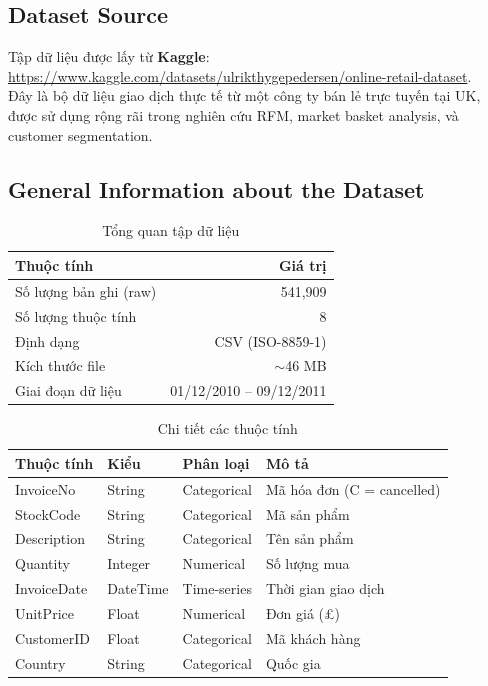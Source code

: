 \documentclass[a4paper,12pt]{article}
\begin{document}
\subsection{Dataset Source}
Tập dữ liệu được lấy từ \textbf{Kaggle}: \\

\url{https://www.kaggle.com/datasets/ulrikthygepedersen/online-retail-dataset}. \\

Đây là bộ dữ liệu giao dịch thực tế từ một công ty bán lẻ trực tuyến tại UK, được sử dụng rộng rãi trong nghiên cứu RFM, market basket analysis, và customer segmentation.

\subsection{General Information about the Dataset}

\begin{table}[H]
\centering
\caption{Tổng quan tập dữ liệu}
\begin{tabular}{|l|r|}
\hline
\textbf{Thuộc tính} & \textbf{Giá trị} \\
\hline
Số lượng bản ghi (raw) & 541,909 \\
Số lượng thuộc tính & 8 \\
Định dạng & CSV (ISO-8859-1) \\
Kích thước file & $\sim$46 MB \\
Giai đoạn dữ liệu & 01/12/2010 -- 09/12/2011 \\
\hline
\end{tabular}
\end{table}

\begin{table}[H]
\centering
\caption{Chi tiết các thuộc tính}
\begin{tabular}{|l|l|l|p{6cm}|}
\hline
\textbf{Thuộc tính} & \textbf{Kiểu} & \textbf{Phân loại} & \textbf{Mô tả} \\
\hline
InvoiceNo & String & Categorical & Mã hóa đơn (C = cancelled) \\
StockCode & String & Categorical & Mã sản phẩm \\
Description & String & Categorical & Tên sản phẩm \\
Quantity & Integer & Numerical & Số lượng mua \\
InvoiceDate & DateTime & Time-series & Thời gian giao dịch \\
UnitPrice & Float & Numerical & Đơn giá (£) \\
CustomerID & Float & Categorical & Mã khách hàng \\
Country & String & Categorical & Quốc gia \\
\hline
\end{tabular}
\end{table}
\end{document}
